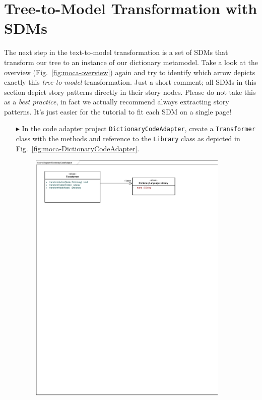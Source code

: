 \section{Tree-to-Model Transformation with SDMs}

The next step in the text-to-model transformation is a set of SDMs that transform our tree to an instance of our dictionary metamodel.
Take a look at the overview (Fig.~\ref{fig:moca-overview}) again and try to identify which arrow depicts exactly this \emph{tree-to-model} transformation.
Just a short comment;  all SDMs in this section depict story patterns directly in their story nodes.
Please do not take this as a \emph{best practice}, in fact we actually recommend always extracting story patterns.
It's just easier for the tutorial to fit each SDM on a single page!

\begin{enumerate}
  \item[$\blacktriangleright$]  In the code adapter project \texttt{DictionaryCodeAdapter}, create a \texttt{Trans\-for\-mer} class with the methods and reference to the \texttt{Library} class as depicted in Fig.~\ref{fig:moca-DictionaryCodeAdapter}.
\begin{figure}[!htbp]
\begin{center}
 \includegraphics[width=0.9\textwidth]{pics/moca/3MocaTreeToModel/DictionaryCodeAdapter}

\end{center}
\end{figure}
\end{enumerate}
